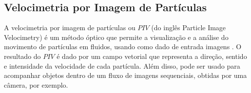 \subsection{Velocimetria por Imagem de Partículas}

A velocimetria por imagem de partículas ou $PIV$ (do inglês Particle Image Velocimetry) 
é um método óptico que permite a visualização e a análise do movimento de partículas em fluidos, 
usando como dado de entrada imagens \cite{Bastiaans}.
O resultado do $PIV$ é dado por um campo vetorial que representa a direção, sentido e intensidade da velocidade de cada 
partícula. Além disso, pode ser usado para acompanhar objetos dentro de um fluxo de imagens sequenciais, 
obtidas por uma câmera, por exemplo.

